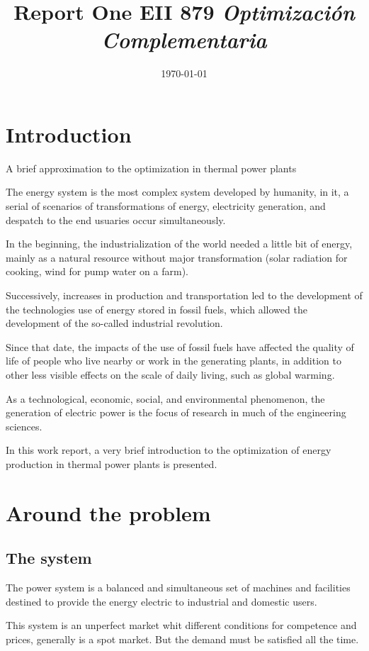 \documentclass{article}
\title{Report One EII 879 \textit{Optimización Complementaria}}
\author{Cristóbal Galleguillos Ketterer^{1}$\\
\small{$^{1}$Industrial PhD Program}\\
\small{Pontificia Universidad Católica de Valparaíso}\\
\small{cristobal.galleguillos@pucv.cl}}
\date{\small{\today}}
\begin{document}
\maketitle

\section{Introduction}

A brief approximation to the optimization in thermal power plants

The energy system is the most complex system developed by humanity, in it, a serial of scenarios of transformations of energy,  electricity generation, and despatch to the end usuaries occur simultaneously.

In the beginning, the industrialization of the world needed a little bit of energy, mainly as a natural resource without major transformation (solar radiation for cooking, wind for pump water on a farm).

Successively, increases in production and transportation led to the development of the technologies use of energy stored in fossil fuels, which allowed the development of the so-called industrial revolution.

Since that date, the impacts of the use of fossil fuels have affected the quality of life of people who live nearby or work in the generating plants, in addition to other less visible effects on the scale of daily living, such as global warming.

As a technological, economic, social, and environmental phenomenon, the generation of electric power is the focus of research in much of the engineering sciences.

In this work report, a very brief introduction to the optimization of energy production in thermal power plants is presented.


\section{Around the problem}

\subsection{The system}

The power system is a balanced and simultaneous set of machines and facilities destined to provide the energy electric to industrial and domestic users.

This system is an unperfect market whit different conditions for competence and prices, generally is a spot market. But the demand must be satisfied all the time.
\end{document}
